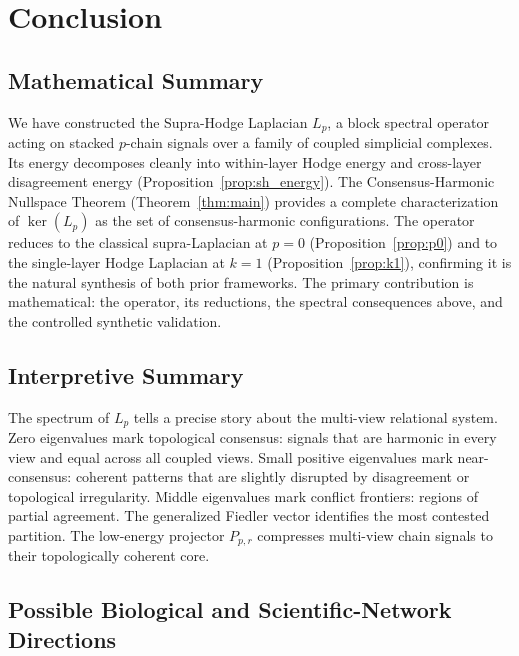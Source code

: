 \documentclass[11pt]{article}
\theoremstyle{definition}
\theoremstyle{remark}
\newcommand{\Pp}{P_{p,r}}
\begin{document}
\clearpage
\section{Conclusion}
\label{sec:conclusion}

\subsection{Mathematical Summary}

We have constructed the Supra-Hodge Laplacian $L_p$, a block spectral operator
acting on stacked $p$-chain signals over a family of coupled simplicial
complexes. Its energy decomposes cleanly into within-layer Hodge energy and
cross-layer disagreement energy (Proposition~\ref{prop:sh_energy}). The
Consensus-Harmonic Nullspace Theorem (Theorem~\ref{thm:main}) provides a
complete characterization of $\ker(L_p)$ as the set of consensus-harmonic
configurations. The operator reduces to the classical supra-Laplacian at $p=0$
(Proposition~\ref{prop:p0}) and to the single-layer Hodge Laplacian at $k=1$
(Proposition~\ref{prop:k1}), confirming it is the natural synthesis of both
prior frameworks. The primary contribution is mathematical: the operator, its
reductions, the spectral consequences above, and the controlled synthetic validation.

\subsection{Interpretive Summary}

The spectrum of $L_p$ tells a precise story about the multi-view relational
system. Zero eigenvalues mark topological consensus: signals that are harmonic
in every view and equal across all coupled views. Small positive eigenvalues
mark near-consensus: coherent patterns that are slightly disrupted by
disagreement or topological irregularity. Middle eigenvalues mark conflict
frontiers: regions of partial agreement. The generalized Fiedler vector
identifies the most contested partition. The low-energy projector $\Pp$
compresses multi-view chain signals to their topologically coherent core.

\subsection{Possible Biological and Scientific-Network Directions}
\end{document}
